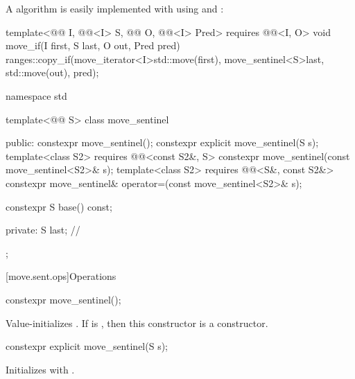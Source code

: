 \pnum
\begin{example}
A  algorithm is easily implemented with
 using  and :
\begin{codeblock}
template<@@ I, @@<I> S, @@ O,
         @@<I> Pred>
  requires @@<I, O>
void move_if(I first, S last, O out, Pred pred) {
  ranges::copy_if(move_iterator<I>{std::move(first)}, move_sentinel<S>{last},
                  std::move(out), pred);
}
\end{codeblock}
\end{example}

%
\begin{codeblock}
namespace std {
  template<@@ S>
  class move_sentinel {
  public:
    constexpr move_sentinel();
    constexpr explicit move_sentinel(S s);
    template<class S2>
      requires @@<const S2&, S>
        constexpr move_sentinel(const move_sentinel<S2>& s);
    template<class S2>
      requires @@<S&, const S2&>
        constexpr move_sentinel& operator=(const move_sentinel<S2>& s);

    constexpr S base() const;

  private:
    S last;     // \expos
  };
}
\end{codeblock}

[move.sent.ops]{Operations}

%
\begin{itemdecl}
constexpr move_sentinel();
\end{itemdecl}

\begin{itemdescr}
\pnum
\effects
Value-initializes .
If  is ,
then this constructor is a  constructor.
\end{itemdescr}

%
\begin{itemdecl}
constexpr explicit move_sentinel(S s);
\end{itemdecl}

\begin{itemdescr}
\pnum
\effects
Initializes  with .
\end{itemdescr}

